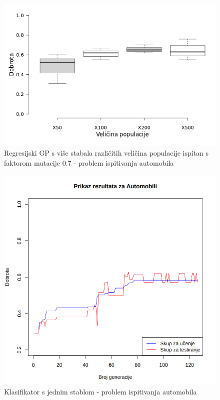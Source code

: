 \documentclass[times, utf8, zavrsni]{fer}
\begin{document}
\begin{figure}[htb]
\centering
\includegraphics[scale=0.5]{grafovi/boxplotCarM}
\caption{Regresijski GP s više stabala različitih veličina populacije ispitan s faktorom mutacije 0.7 - problem ispitivanja automobila}
\end{figure}

\begin{figure}[htb]
\centering
\includegraphics[scale=0.45]{grafovi/automobili1-3}
\caption{Klasifikator s jednim stablom - problem ispitivanja automobila}
\end{figure}
\end{document}

